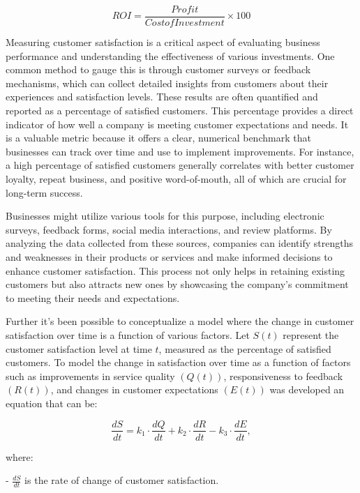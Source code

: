 \begin{multicols}{2}
\begin{equation}
ROI = \frac{Profit}{CostofInvestment} \times 100
\end{equation}

Measuring customer satisfaction is a critical aspect of evaluating
business performance and understanding the effectiveness of various
investments. One common method to gauge this is through customer surveys
or feedback mechanisms, which can collect detailed insights from
customers about their experiences and satisfaction levels. These results
are often quantified and reported as a percentage of satisfied
customers. This percentage provides a direct indicator of how well a
company is meeting customer expectations and needs. It is a valuable
metric because it offers a clear, numerical benchmark that businesses
can track over time and use to implement improvements. For instance, a
high percentage of satisfied customers generally correlates with better
customer loyalty, repeat business, and positive word-of-mouth, all of
which are crucial for long-term success.

Businesses might utilize various tools for this purpose, including
electronic surveys, feedback forms, social media interactions, and
review platforms. By analyzing the data collected from these sources,
companies can identify strengths and weaknesses in their products or
services and make informed decisions to enhance customer satisfaction.
This process not only helps in retaining existing customers but also
attracts new ones by showcasing the company's commitment to meeting
their needs and expectations.

Further it's been possible to conceptualize a model where the change in
customer satisfaction over time is a function of various factors. Let
\(S(t)\) represent the customer satisfaction level at time \(t\),
measured as the percentage of satisfied customers. To model the change
in satisfaction over time as a function of factors such as improvements
in service quality \((Q(t))\), responsiveness to feedback \((R(t))\),
and changes in customer expectations \((E(t))\) was developed an
equation that can be:

\begin{equation}
\frac{dS}{dt} = k_{1} \cdot \frac{dQ}{dt} + k_{2} \cdot \frac{dR}{dt} - k_{3} \cdot \frac{dE}{dt},
\end{equation}

where:

- \(\frac{dS}{dt}\) is the rate of change of customer satisfaction.


\end{multicols}

